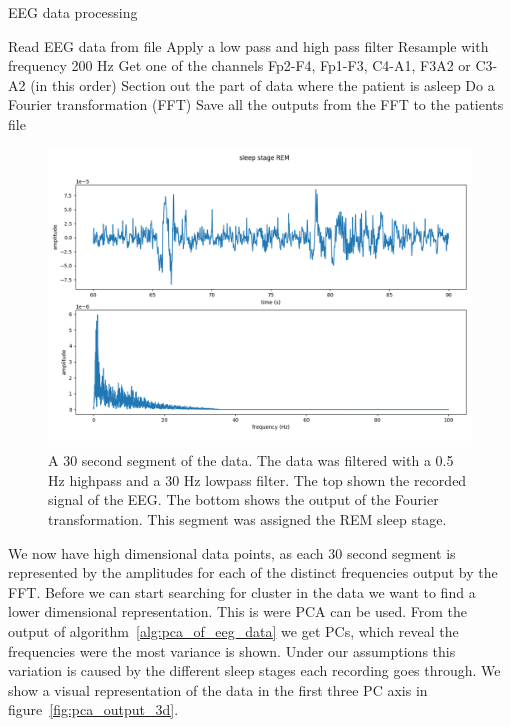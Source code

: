 \begin{algorithm}
	\caption{EEG data processing}\label{alg:process_eeg_data}
	\begin{algorithmic}
		\State Read EEG data from file
		\State Apply a low pass and high pass filter
		\State Resample with frequency 200 Hz
		\State Get one of the channels Fp2-F4, Fp1-F3, C4-A1, F3A2 or C3-A2 (in this order)
		\State Section out the part of data where the patient is asleep
		\State Do a Fourier transformation (FFT)
		\EndFor
		\State Save all the outputs from the FFT to the patients file
		\EndFor
	\end{algorithmic}
\end{algorithm}


\begin{figure}
	\centering
	\includegraphics[width=\linewidth]{figs/example_30s_segment}
	\caption{A 30 second segment of the data. The data was filtered with a 0.5 Hz highpass and a 30 Hz lowpass filter. The top shown the recorded signal of the EEG. The bottom shows the output of the Fourier transformation. This segment was assigned the REM sleep stage.}
	\label{fig:example_30s_segment}
\end{figure}


We now have high dimensional data points, as each 30 second segment is represented by the amplitudes for each of the distinct frequencies output by the FFT. Before we can start searching for cluster in the data we want to find a lower dimensional representation. This is were PCA can be used. From the output of algorithm~\ref{alg:pca_of_eeg_data} we get PCs, which reveal the frequencies were the most variance is shown. Under our assumptions this variation is caused by the different sleep stages each recording goes through. We show a visual representation of the data in the first three PC axis in figure~\ref{fig:pca_output_3d}.

